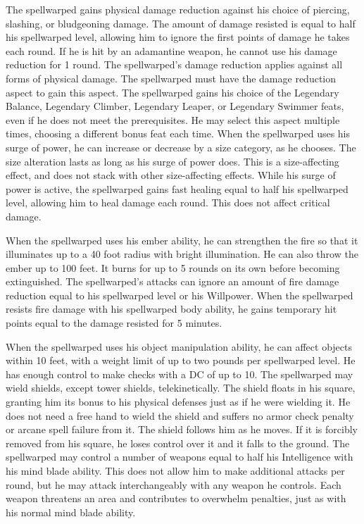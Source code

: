 The spellwarped gains physical damage reduction against his choice of piercing, slashing, or bludgeoning damage.
The amount of damage resisted is equal to half his spellwarped level, allowing him to ignore the first points of damage he takes each round.
If he is hit by an adamantine weapon, he cannot use his damage reduction for 1 round.
The spellwarped's damage reduction applies against all forms of physical damage.
The spellwarped must have the damage reduction aspect to gain this aspect.
The spellwarped gains his choice of the Legendary Balance, Legendary Climber, Legendary Leaper, or Legendary Swimmer feats, even if he does not meet the prerequisites.
He may select this aspect multiple times, choosing a different bonus feat each time.
When the spellwarped uses his surge of power, he can increase or decrease by a size category, as he chooses.
The size alteration lasts as long as his surge of power does.
This is a size-affecting effect, and does not stack with other size-affecting effects.
While his surge of power is active, the spellwarped gains fast healing equal to half his spellwarped level, allowing him to heal damage each round.
This does not affect critical damage.

When the spellwarped uses his ember ability, he can strengthen the fire so that it illuminates up to a 40 foot radius with bright illumination.
He can also throw the ember up to 100 feet.
It burns for up to 5 rounds on its own before becoming extinguished.
The spellwarped's attacks can ignore an amount of fire damage reduction equal to his spellwarped level or his Willpower.
When the spellwarped resists fire damage with his spellwarped body ability, he gains temporary hit points equal to the damage resisted for 5 minutes.

When the spellwarped uses his object manipulation ability, he can affect objects within 10 feet, with a weight limit of up to two pounds per spellwarped level.
He has enough control to make checks with a DC of up to 10.
The spellwarped may wield shields, except tower shields, telekinetically.
The shield floats in his square, granting him its bonus to his physical defenses just as if he were wielding it.
He does not need a free hand to wield the shield and suffers no armor check penalty or arcane spell failure from it.
The shield follows him as he moves.
If it is forcibly removed from his square, he loses control over it and it falls to the ground.
The spellwarped may control a number of weapons equal to half his Intelligence with his mind blade ability.
This does not allow him to make additional attacks per round, but he may attack interchangeably with any weapon he controls.
Each weapon threatens an area and contributes to overwhelm penalties, just as with his normal mind blade ability.

